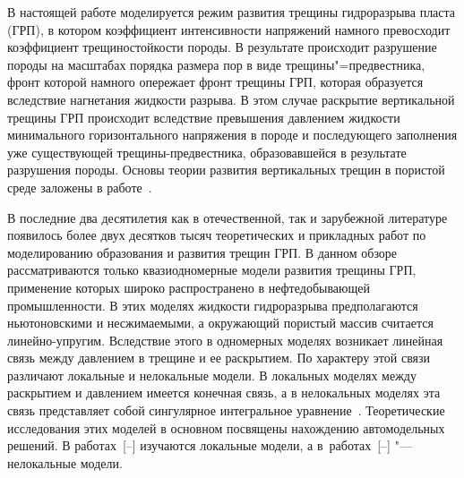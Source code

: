 \date{17/XI/2016} %










\makerutitle






В настоящей работе моделируется режим развития трещины гидроразрыва пласта (ГРП), в котором коэффициент интенсивности напряжений намного превосходит коэффициент трещиностойкости породы. В результате происходит разрушение породы на масштабах порядка размера пор в виде трещины"=предвестника, фронт которой намного опережает фронт трещины ГРП, которая образуется вследствие нагнетания жидкости разрыва. В этом случае раскрытие вертикальной трещины ГРП происходит вследствие превышения давлением жидкости минимального горизонтального напряжения в породе и последующего заполнения уже существующей трещины-предвестника, образовавшейся в результате разрушения породы. Основы теории развития вертикальных трещин в пористой среде заложены в работе~\cite{Zheltov-Christ}.



В последние два десятилетия как в отечественной, так и зарубежной литературе появилось более двух десятков тысяч теоретических и прикладных работ по моделированию образования и развития трещин ГРП. В данном обзоре рассматриваются только квазиодномерные модели развития трещины ГРП, применение которых широко распространено в нефтедобывающей промышленности. В этих моделях жидкости гидроразрыва предполагаются ньютоновскими и несжимаемыми, а окружающий пористый массив считается линейно-упругим. Вследствие этого в одномерных моделях возникает линейная связь между давлением в трещине и ее раскрытием. По характеру этой связи различают локальные и нелокальные модели. В локальных моделях между раскрытием и давлением имеется конечная связь, а в нелокальных моделях эта связь представляет собой сингулярное интегральное уравнение~\cite{Mush}. Теоретические исследования этих моделей в основном посвящены нахождению автомодельных решений. В работах~[--]  изучаются локальные модели, а в~работах~[--] "--- нелокальные модели.



